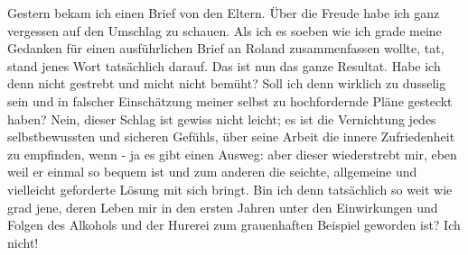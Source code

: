 \def\day{26. Januar 1943.}
\mktitle

Gestern bekam ich einen Brief von den Eltern.
\"{U}ber die Freude habe ich ganz vergessen auf den Umschlag zu schauen.
Als ich es soeben wie ich grade meine Gedanken f\"{u}r einen ausf\"{u}hrlichen Brief an Roland zusammenfassen wollte, tat, stand jenes Wort tats\"{a}chlich darauf.
Das ist nun das ganze Resultat.
Habe ich denn nicht gestrebt und micht nicht bem\"{u}ht?
Soll ich denn wirklich zu dusselig sein und in falscher Einsch\"{a}tzung meiner selbst zu hochfordernde Pl\"{a}ne gesteckt haben?
Nein, dieser Schlag ist gewiss nicht leicht; es ist die Vernichtung jedes selbstbewussten und sicheren Gef\"{u}hls, \"{u}ber seine Arbeit die innere Zufriedenheit zu empfinden, wenn - ja es gibt einen Ausweg: aber dieser wiederstrebt mir, eben weil er einmal so bequem ist und zum anderen die seichte, allgemeine und vielleicht geforderte L\"{o}sung mit sich bringt.
Bin ich denn tats\"{a}chlich so weit wie grad jene, deren Leben mir in den ersten Jahren unter den Einwirkungen und Folgen des Alkohols und der Hurerei zum grauenhaften Beispiel geworden ist?
Ich nicht!


\clearpage
